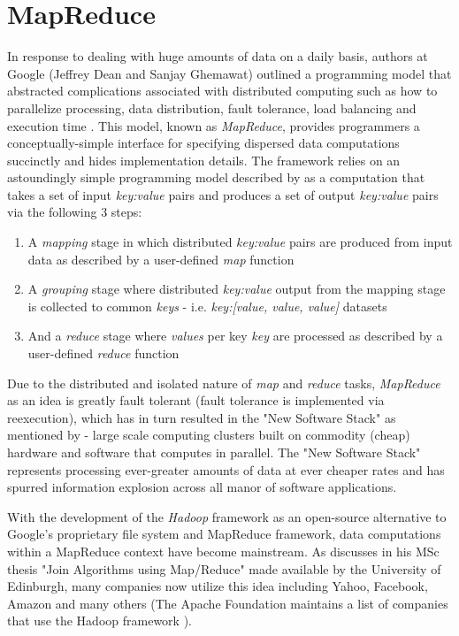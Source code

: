 \section{MapReduce}
In response to dealing with huge amounts of data on a daily basis, authors at Google (Jeffrey Dean and Sanjay Ghemawat) outlined a programming model that abstracted complications associated with distributed computing such as how to parallelize processing, data distribution, fault tolerance, load balancing and execution time \cite{Dean:2008}. This model, known as \textit{MapReduce}, provides programmers a conceptually-simple interface for specifying dispersed data computations succinctly and hides implementation details. The framework relies on an astoundingly simple programming model described by \cite{Dean:2008} as a computation that takes a set of input \textit{key:value} pairs and produces a set of output \textit{key:value} pairs via the following 3 steps:

\begin{enumerate}
    \item A \textit{mapping} stage in which distributed \textit{key:value} pairs are produced from input data as described by a user-defined \textit{map} function
    \item A \textit{grouping} stage where distributed \textit{key:value} output from the mapping stage is collected to common \textit{keys} - i.e. \textit{key:[value, value, value]} datasets
    \item And a \textit{reduce} stage where \textit{values} per key \textit{key} are processed as described by a user-defined \textit{reduce} function
\end{enumerate}

Due to the distributed and isolated nature of \textit{map} and \textit{reduce} tasks, \textit{MapReduce} as an idea is greatly fault tolerant (fault tolerance is implemented via reexecution), which has in turn resulted in the "New Software Stack" as mentioned by \cite{mining2011} - large scale computing clusters built on commodity (cheap) hardware and software that computes in parallel. The "New Software Stack" represents processing ever-greater amounts of data at ever cheaper rates and has spurred information explosion across all manor of software applications.

With the development of the \textit{Hadoop} framework as an open-source alternative to Google's proprietary file system and MapReduce framework, data computations within a MapReduce context have become mainstream. As \cite{chandar2010} discusses in his MSc thesis "Join Algorithms using Map/Reduce" made available by the University of Edinburgh, many companies now utilize this idea including Yahoo, Facebook, Amazon and many others (The Apache Foundation maintains a list of companies that use the Hadoop framework \cite{hadoopPower:2017}).

